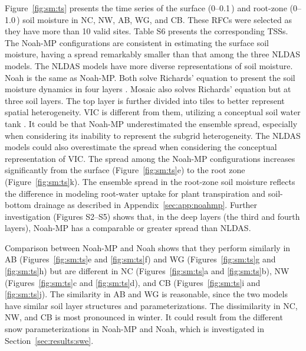 \documentclass[essd, manuscript]{copernicus}
\let\unit\undefined
\begin{document}
Figure~\ref{fig:sm:ts} presents the time series of the surface (0--0.1\,\unit{m}) and root-zone (0--1.0\,\unit{m}) soil moisture in NC, NW, AB, WG, and CB\@. These RFCs were selected as they have more than 10 valid sites. Table S6 presents the corresponding TSSs. The Noah-MP configurations are consistent in estimating the surface soil moisture, having a spread remarkably smaller than that among the three NLDAS models. The NLDAS models have more diverse representations of soil moisture. Noah is the same as Noah-MP\@. Both solve Richards' equation to present the soil moisture dynamics in four layers \citep{niu2011JGRA}. Mosaic also solves Richards' equation but at three soil layers. The top layer is further divided into tiles to better represent spatial heterogeneity\citep{koster1992JGRA}. VIC is different from them, utilizing a conceptual soil water tank \citep{liang1994JGRA}. It could be that Noah-MP underestimated the ensemble spread, especially when considering its inability to represent the subgrid heterogeneity. The NLDAS models could also overestimate the spread when considering the conceptual representation of VIC\@. The spread among the Noah-MP configurations increases significantly from the surface (Figure~\ref{fig:sm:ts}e) to the root zone (Figure~\ref{fig:sm:ts}k). The ensemble spread in the root-zone soil moisture reflects the difference in modeling root-water uptake for plant transpiration and soil-bottom drainage as described in Appendix~\ref{sec:app:noahmp}. Further investigation (Figures S2--S5) shows that, in the deep layers (the third and fourth layers), Noah-MP has a comparable or greater spread than NLDAS\@.

Comparison between Noah-MP and Noah shows that they perform similarly in AB (Figures~\ref{fig:sm:ts}e and \ref{fig:sm:ts}f) and WG (Figures~\ref{fig:sm:ts}g and \ref{fig:sm:ts}h) but are different in NC (Figures~\ref{fig:sm:ts}a and \ref{fig:sm:ts}b), NW (Figures~\ref{fig:sm:ts}c and \ref{fig:sm:ts}d), and CB (Figures~\ref{fig:sm:ts}i and \ref{fig:sm:ts}j). The similarity in AB and WG is reasonable, since the two models have similar soil layer structures and parameterizations. The dissimilarity in NC, NW, and CB is most pronounced in winter. It could result from the different snow parameterizations in Noah-MP and Noah, which is investigated in Section~\ref{sec:results:swe}.
\end{document}
